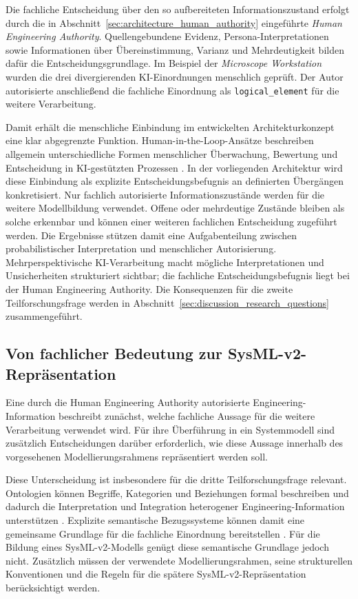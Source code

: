 Die fachliche Entscheidung über den so aufbereiteten Informationszustand
erfolgt durch die in
Abschnitt~\ref{sec:architecture_human_authority} eingeführte
\emph{Human Engineering Authority}. Quellengebundene Evidenz,
Persona-Interpretationen sowie Informationen über Übereinstimmung, Varianz
und Mehrdeutigkeit bilden dafür die Entscheidungsgrundlage. Im Beispiel der
\emph{Microscope Workstation} wurden die drei divergierenden
KI-Einordnungen menschlich geprüft. Der Autor autorisierte anschließend die
fachliche Einordnung als \texttt{logical\_element} für die weitere
Verarbeitung.

Damit erhält die menschliche Einbindung im entwickelten Architekturkonzept
eine klar abgegrenzte Funktion. Human-in-the-Loop-Ansätze beschreiben
allgemein unterschiedliche Formen menschlicher Überwachung, Bewertung und
Entscheidung in KI-gestützten Prozessen
\cite{MosqueiraRey2023,Lazaros2026}. In der vorliegenden Architektur wird
diese Einbindung als explizite Entscheidungsbefugnis an definierten
Übergängen konkretisiert. Nur fachlich autorisierte Informationszustände
werden für die weitere Modellbildung verwendet. Offene oder mehrdeutige
Zustände bleiben als solche erkennbar und können einer weiteren fachlichen
Entscheidung zugeführt werden.
\newpage 
Die Ergebnisse stützen damit eine Aufgabenteilung zwischen
probabilistischer Interpretation und menschlicher Autorisierung.
Mehrperspektivische KI-Verarbeitung macht mögliche Interpretationen und
Unsicherheiten strukturiert sichtbar; die fachliche Entscheidungsbefugnis
liegt bei der Human Engineering Authority. Die Konsequenzen für die zweite
Teilforschungsfrage werden in
Abschnitt~\ref{sec:discussion_research_questions} zusammengeführt.

\subsection{Von fachlicher Bedeutung zur SysML-v2-Repräsentation}
\label{sec:discussion_model_formation}

Eine durch die Human Engineering Authority autorisierte
Engineering-Information beschreibt zunächst, welche fachliche Aussage für
die weitere Verarbeitung verwendet wird. Für ihre Überführung in ein
Systemmodell sind zusätzlich Entscheidungen darüber erforderlich, wie diese
Aussage innerhalb des vorgesehenen Modellierungsrahmens repräsentiert werden
soll.

Diese Unterscheidung ist insbesondere für die dritte Teilforschungsfrage
relevant. Ontologien können Begriffe, Kategorien und Beziehungen formal
beschreiben und dadurch die Interpretation und Integration heterogener
Engineering-Information unterstützen
\cite{OrellanaMandrick2019,Lu2022,Kulvatunyou2022}. Explizite semantische
Bezugssysteme können damit eine gemeinsame Grundlage für die fachliche
Einordnung bereitstellen \cite{ISO21838_2_2021}. Für die Bildung eines
SysML-v2-Modells genügt diese semantische Grundlage jedoch nicht. Zusätzlich
müssen der verwendete Modellierungsrahmen, seine strukturellen Konventionen
und die Regeln für die spätere SysML-v2-Repräsentation berücksichtigt
werden.

